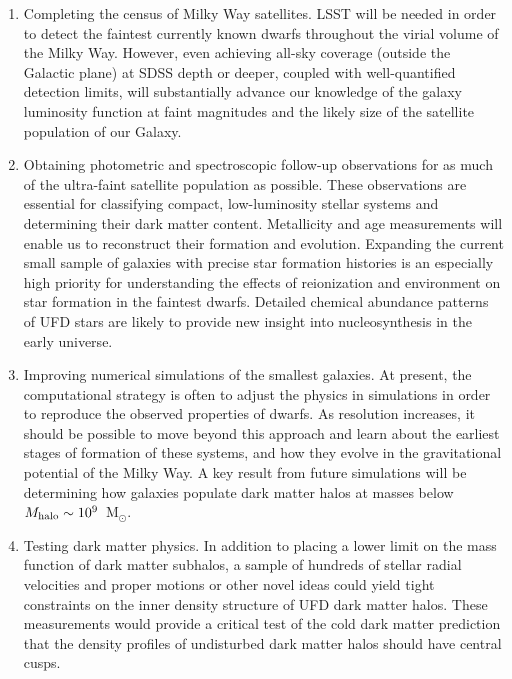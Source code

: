 \documentclass[a4paper]{ar-1col}
\newcommand{\msun}        {M$_{\odot}$}
\begin{document}
\begin{issues}
\begin{enumerate}
\item Completing the census of Milky Way satellites.  LSST will be
  needed in order to detect the faintest currently known dwarfs
  throughout the virial volume of the Milky Way.  However, even
  achieving all-sky coverage (outside the Galactic plane) at SDSS
  depth or deeper, coupled with well-quantified detection limits, will
  substantially advance our knowledge of the galaxy luminosity
  function at faint magnitudes and the likely size of the satellite
  population of our Galaxy.
\item Obtaining photometric and spectroscopic follow-up observations
  for as much of the ultra-faint satellite population as possible.
  These observations are essential for classifying compact,
  low-luminosity stellar systems and determining their dark matter
  content.  Metallicity and age measurements will enable us to
  reconstruct their formation and evolution.  Expanding the current
  small sample of galaxies with precise star formation histories is an
  especially high priority for understanding the effects of
  reionization and environment on star formation in the faintest
  dwarfs.  Detailed chemical abundance patterns of UFD stars are
  likely to provide new insight into nucleosynthesis in the early
  universe.
\item Improving numerical simulations of the smallest galaxies.  At
  present, the computational strategy is often to adjust the physics
  in simulations in order to reproduce the observed properties of
  dwarfs.  As resolution increases, it should be possible to move
  beyond this approach and learn about the earliest stages of
  formation of these systems, and how they evolve in the gravitational
  potential of the Milky Way.  A key result from future simulations
  will be determining how galaxies populate dark matter halos at
  masses below $M_{{\rm halo}} \sim 10^{9}$~\msun.
\item Testing dark matter physics.  In addition to placing a lower
  limit on the mass function of dark matter subhalos, a sample of
  hundreds of stellar radial velocities and proper motions or other
  novel ideas could yield tight constraints on the inner density
  structure of UFD dark matter halos.  These measurements would
  provide a critical test of the cold dark matter prediction that the
  density profiles of undisturbed dark matter halos should have
  central cusps.
\end{enumerate}
\end{issues}
\end{document}
